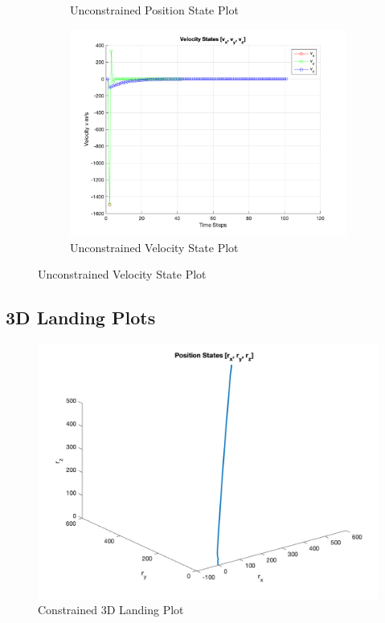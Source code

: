 \documentclass[conference, tikz]{IEEEtran}
\begin{document}
\begin{figure}[H]
\begin{subfigure}{\columnwidth}
        \caption{Unconstrained Position State Plot}
        \label{unconst:pos_state}
    \end{subfigure}
    \begin{subfigure}{\columnwidth}
        \centering
        \includegraphics[width=\columnwidth]{new_final_figs/Unconstrained_velocity_state_plot.png}
        \caption{Unconstrained Velocity State Plot}
        \label{unconst:vel_ss}
    \end{subfigure}
\end{figure}

\subsection{3D Landing Plots}

    \begin{figure}[H]{\columnwidth}
        \centering
        \includegraphics[width=\columnwidth]{new_final_figs/Constrained_position_3D_plot.png}
        \caption{Constrained 3D Landing Plot}
        \label{const:3D}
    \end{figure}
    
\end{document}
